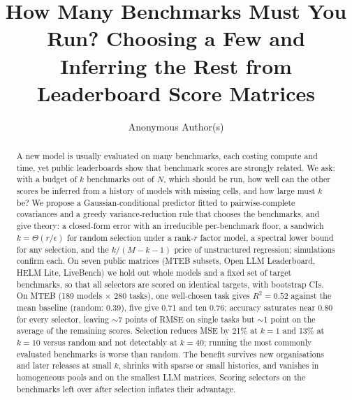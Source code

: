 \documentclass{article}
\title{How Many Benchmarks Must You Run? Choosing a Few and Inferring the Rest from Leaderboard Score Matrices}
\author{Anonymous Author(s)}
\begin{document}
\maketitle

\begin{abstract}
A new model is usually evaluated on many benchmarks, each costing compute and time, yet public leaderboards show that benchmark scores are strongly related. We ask: with a budget of $k$ benchmarks out of $N$, which should be run, how well can the other scores be inferred from a history of models with missing cells, and how large must $k$ be?
We propose a Gaussian-conditional predictor fitted to pairwise-complete covariances and a greedy variance-reduction rule that chooses the benchmarks, and give theory: a closed-form error with an irreducible per-benchmark floor, a sandwich $k=\Theta(r/\epsilon)$ for random selection under a rank-$r$ factor model, a spectral lower bound for any selection, and the $k/(M-k-1)$ price of unstructured regression; simulations confirm each.
On seven public matrices (MTEB subsets, Open LLM Leaderboard, HELM Lite, LiveBench) we hold out whole models and a fixed set of target benchmarks, so that all selectors are scored on identical targets, with bootstrap CIs.
On MTEB (189 models $\times$ 280 tasks), one well-chosen task gives $R^2=0.52$ against the mean baseline (random: 0.39), five give 0.71 and ten 0.76; accuracy saturates near 0.80 for every selector, leaving $\sim$7 points of RMSE on single tasks but $\sim$1 point on the average of the remaining scores.
Selection reduces MSE by 21\% at $k=1$ and 13\% at $k=10$ versus random and not detectably at $k=40$; running the most commonly evaluated benchmarks is worse than random. The benefit survives new organisations and later releases at small $k$, shrinks with sparse or small histories, and vanishes in homogeneous pools and on the smallest LLM matrices. Scoring selectors on the benchmarks left over after selection inflates their advantage.
\end{abstract}










\appendix




\end{document}
